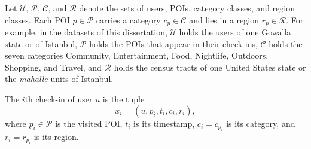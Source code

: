 Let $\mathcal{U}$, $\mathcal{P}$, $\mathcal{C}$, and $\mathcal{R}$ denote the sets of
users, POIs, category classes, and region classes. Each POI $p\in\mathcal{P}$ carries a
category $c_p\in\mathcal{C}$ and lies in a region $r_p\in\mathcal{R}$.
For example, in the datasets of this dissertation, $\mathcal{U}$ holds the users of one
Gowalla state or of Istanbul, $\mathcal{P}$ holds the POIs that appear in their check-ins,
$\mathcal{C}$ holds the seven categories Community, Entertainment, Food, Nightlife,
Outdoors, Shopping, and Travel, and $\mathcal{R}$ holds the census tracts of one United
States state or the \emph{mahalle} units of Istanbul.

\begin{definition}[Check-in]\label{def:fund:checkin}
    The $i$th check-in of user $u$ is the tuple
    \begin{equation}
        x_i=(u,p_i,t_i,c_i,r_i),
    \end{equation}
    where $p_i\in\mathcal{P}$ is the visited POI, $t_i$ is its timestamp,
    $c_i=c_{p_i}$ is its category, and $r_i=r_{p_i}$ is its region.
\end{definition}

